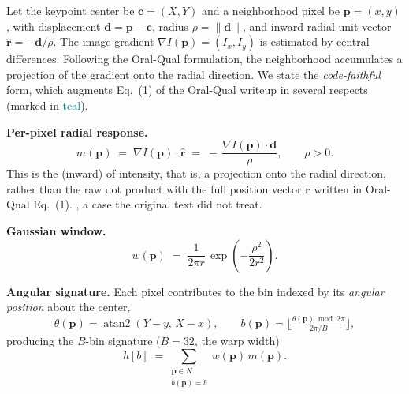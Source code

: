 Let the keypoint center be $\mathbf{c}=(X,Y)$ and a neighborhood pixel be
$\mathbf{p}=(x,y)$, with displacement $\mathbf{d}=\mathbf{p}-\mathbf{c}$, radius
$\rho=\lVert\mathbf{d}\rVert$, and inward radial unit vector
$\hat{\mathbf{r}}=-\mathbf{d}/\rho$. The image gradient
$\nabla I(\mathbf{p})=(I_x,I_y)$ is estimated by central differences. Following
the Oral-Qual formulation, the neighborhood accumulates a projection of the
gradient onto the radial direction. We state the \emph{code-faithful} form,
which augments Eq.~(1) of the Oral-Qual writeup in several respects
(marked in \textcolor{teal}{teal}).

\vspace{0.3em}
\noindent\textbf{Per-pixel radial response.}
\begin{equation}
\label{eq:radial}
m(\mathbf{p}) \;=\; \nabla I(\mathbf{p})\cdot\hat{\mathbf{r}}
\;=\; -\,\frac{\nabla I(\mathbf{p})\cdot\mathbf{d}}{\rho},
\qquad \rho>0 .
\end{equation}
This is the (inward)  of intensity, that is, a
projection onto the  radial direction, rather than the raw
dot product with the full position vector $\mathbf{r}$ written in Oral-Qual
Eq.~(1). , a case the
original text did not treat.

\vspace{0.3em}
\noindent\textbf{Gaussian window.}
\begin{equation}
\label{eq:weight}
w(\mathbf{p}) \;=\; \frac{1}{2\pi r}\,
\exp\!\left(-\frac{\rho^{2}}{2r^{2}}\right).
\end{equation}

\vspace{0.3em}
\noindent\textbf{Angular signature.} Each pixel contributes to the bin indexed
by its \emph{angular position} about the center,
\begin{equation}
\label{eq:bin}
\theta(\mathbf{p}) = \operatorname{atan2}(Y-y,\,X-x),\qquad
b(\mathbf{p}) = \Big\lfloor \tfrac{\theta(\mathbf{p})\bmod 2\pi}{2\pi/B}\Big\rfloor,
\end{equation}
producing the $B$-bin signature ($B=32$, the warp width)
\begin{equation}
\label{eq:signature}
h[b] \;=\!\! \sum_{\substack{\mathbf{p}\in N\\ b(\mathbf{p})=b}}\!\! w(\mathbf{p})\,m(\mathbf{p}).
\end{equation}

